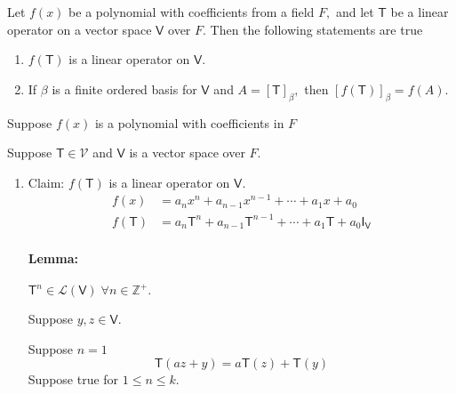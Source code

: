 Let $f(x)$ be a polynomial with coefficients from a field $F,$ and let
$\mathsf{T}$ be a linear operator on a vector space $\mathsf{V}$ over
$F$. Then the following statements are true
\begin{enumerate}
\item $f(\mathsf{T})$ is a linear operator on $\mathsf{V}.$
\item If $\beta$ is a finite ordered basis for $\mathsf{V}$ and $A =
  [\mathsf{T}]_\beta,$ then $[f(\mathsf{T})]_\beta = f(A).$
\end{enumerate}

Suppose $f(x)$ is a polynomial with coefficients in $F$

Suppose $\mathsf{T} \in \mathcal{V}$ and $\mathsf{V}$ is a vector
space over $F.$
\begin{enumerate}
\item Claim: $f(\mathsf{T})$ is a linear operator on $\mathsf{V}.$
\begin{align}
f(x) &= a_nx^n + a_{n-1}x^{n-1} + \dotsb + a_1x + a_0 \\
f(\mathsf{T}) &= a_n\mathsf{T}^n + a_{n-1}\mathsf{T}^{n-1} + \dotsb +
a_1\mathsf{T} + a_0\mathsf{I}_\mathsf{V}
\end{align}
\paragraph{Lemma: } $\mathsf{T}^n \in \mathcal{L}(\mathsf{V})\; \forall
n \in \mathbb{Z}^+.$

Suppose $y,z \in \mathsf{V}.$

Suppose $n=1$
\begin{equation}
\mathsf{T}(az+y) = a\mathsf{T}(z) +\mathsf{T}(y)
\end{equation}
Suppose true for $1\leq n\leq k.$


\end{enumerate}

